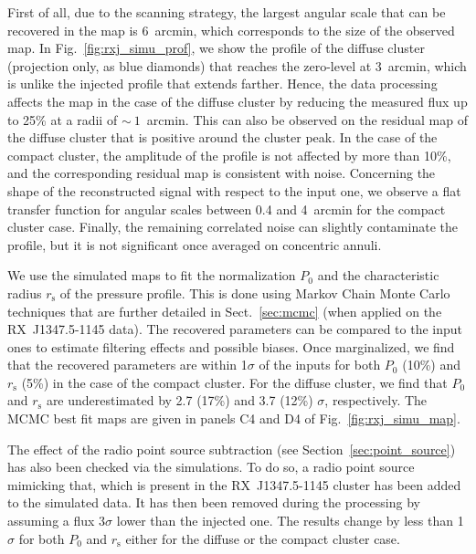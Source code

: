 First of all, due to the scanning strategy, the largest angular scale that can be recovered in the map is 6~arcmin, which corresponds to the size of the observed map. In Fig.~\ref{fig:rxj_simu_prof}, we show the profile of the diffuse cluster (projection only, as blue diamonds) that reaches the zero-level at 3~arcmin, which is unlike the injected profile that extends farther. Hence, the data processing affects the map in the case of the diffuse cluster by reducing the measured flux up to 25\% at a radii of $\sim~1$~arcmin. This can also be observed on the residual map of the diffuse cluster that is positive around the cluster peak. In the case of the compact cluster, the amplitude of the profile is not affected by more than 10\%, and the corresponding residual map is consistent with noise. Concerning the shape of the reconstructed signal with respect to the input one, we observe a flat transfer function for angular scales between  0.4 and 4~arcmin for the compact cluster case. Finally, the remaining correlated noise can slightly contaminate the profile, but it is not significant once averaged on concentric annuli.

We use the simulated maps to fit the normalization $P_0$ and the characteristic radius $r_{\mathrm{s}}$ of the pressure profile. This is done using Markov Chain Monte Carlo techniques that are further detailed in Sect.~\ref{sec:mcmc} (when applied on the \mbox{RX~J1347.5-1145} data). The recovered parameters can be compared to the input ones to estimate filtering effects and possible biases. Once marginalized, we find that the recovered parameters are within 1$\sigma$ of the inputs for both $P_0$ (10\%) and $r_{\mathrm{s}}$ (5\%) in the case of the compact cluster. For the diffuse cluster, we find that $P_0$ and $r_{\mathrm{s}}$ are underestimated by 2.7 (17\%) and 3.7 (12\%) $\sigma$, respectively. The MCMC best fit maps are given in panels C4 and D4 of Fig.~\ref{fig:rxj_simu_map}.

The effect of the radio point source subtraction (see Section~\ref{sec:point_source}) has also been checked via the simulations. To do so, a radio point source mimicking that, which is present in the \mbox{RX~J1347.5-1145} cluster has been added to the simulated data. It has then been removed during the processing by assuming a flux 3$\sigma$ lower than the injected one. The results change by less than 1$\sigma$ for both $P_0$ and $r_{\mathrm{s}}$ either for the diffuse or the compact cluster case.


